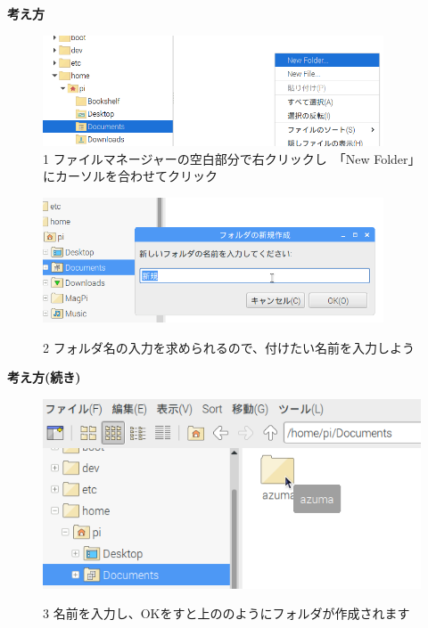 \documentclass[a4paper,12pt]{jarticle}
\begin{document}
{\bf \large 考え方}
\begin{figure}[ht]
  \includegraphics[width=0.9\textwidth]{textbook-img034.png}
    \centering
    \\1
    ファイルマネージャーの空白部分で右クリックし　「New Folder」にカーソルを合わせてクリック
    \vspace{60pt}
  \begin{minipage}{\textwidth}
    \includegraphics[width=0.9\textwidth]{textbook-img036.png}
  \end{minipage}
    2
    フォルダ名の入力を求められるので、付けたい名前を入力しよう
\end{figure}
\clearpage
{\bf\large 考え方(続き)}
\begin{figure}[hb]
  \centering
  \includegraphics[width=11.398cm]{textbook-img038.png}
  \centering
  \begin{minipage}{13.001cm}
    3
    名前を入力し、OKをすと上ののようにフォルダが作成されます
  \end{minipage}

\end{figure}
\end{document}
